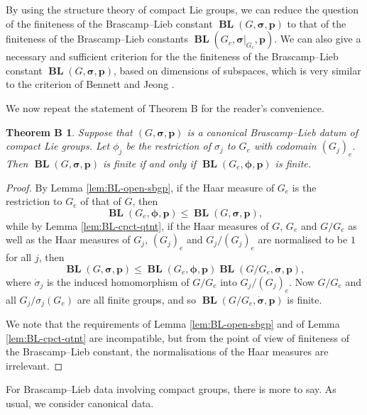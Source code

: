 \documentclass[12pt,twoside,a4paper]{amsart}
\newtheorem*{thmB}{Theorem B}
\theoremstyle{definition}
\theoremstyle{remark}
\numberwithin{equation}{section}
\newcommand{\BL}{\operatorname{\mathbf{BL}}}
\newcommand{\bss}{\boldsymbol{\sigma}}
\newcommand{\bsds}{\boldsymbol{\dot\sigma}}
\newcommand{\bsphi}{\boldsymbol{\phi}}
\newcommand{\bsp}{\boldsymbol{p}}
\begin{document}
By using the structure theory of compact Lie groups, we can reduce the question of the finiteness of the Brascamp--Lieb constant $\BL(G,\bss,\bsp)$ to that of the finiteness of the Brascamp--Lieb constants $\BL(G_c,\bss|_{G_c} ,\bsp)$.
We can also give a necessary and sufficient criterion for the the finiteness of the Brascamp--Lieb constant $\BL(G,\bss,\bsp)$, based on dimensions of subspaces, which is very similar to the criterion of Bennett and Jeong \cite{BJ22}.

We now repeat the statement of Theorem B for the reader's convenience.

\begin{thmB}%
Suppose that  $(G, \bss,\bsp)$ is a canonical Brascamp--Lieb datum of compact Lie groups. 
Let $\phi_j$ be the restriction of $\sigma_j$ to $G_e$ with codomain $(G_j)_e$. 
Then  $\BL(G, \bss, \bsp)$ is finite if and only if $\BL(G_e, \bsphi, \bsp)$ is finite.
\end{thmB}

\begin{proof}
By Lemma \ref{lem:BL-open-sbgp}, if the Haar measure of $G_e$ is the restriction to $G_e$ of that of $G$, then
\[
\BL(G_e, \bsphi, \bsp) \leq \BL(G, \bss, \bsp),
\]
while by Lemma \ref{lem:BL-cpct-qtnt}, if the Haar measures of $G$, $G_e$ and $G/G_e$ as well as the Haar measures of $G_j$, $(G_j)_e$ and $G_j/ (G_j)_e$ are normalised to be $1$ for all $j$, then
\begin{equation}\label{eq:BL-cpct-gp}
\BL(G, \bss, \bsp) \leq \BL(G_e, \bsphi, \bsp) \BL(G/G_e , \bsds, \bsp),
\end{equation}
where $\dot\sigma_j$ is the induced homomorphism of $G/G_e$ into $G_j/(G_j)_e$.
Now $G/G_e$ and all $G_j/\sigma_j(G_e)$ are all finite groups, and so $\BL(G/G_e , \bsds, \bsp)$ is finite.

We note that the requirements of Lemma \ref{lem:BL-open-sbgp} and of Lemma \ref{lem:BL-cpct-qtnt} are incompatible, but from the point of view of finiteness of the Brascamp--Lieb constant, the normalisations of the Haar measures are irrelevant.
\end{proof}

For  Brascamp--Lieb data involving compact groups,	there is more to say.
As usual, we consider canonical data.
\end{document}
